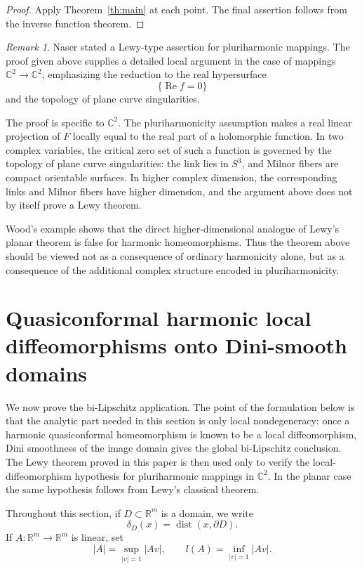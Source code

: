 \documentclass[11pt]{amsart}
\theoremstyle{definition}
\theoremstyle{remark}
\newtheorem{remark}[theorem]{Remark}
\newcommand{\C}{\mathbb C}
\newcommand{\R}{\mathbb R}
\newcommand{\re}{\operatorname{Re}}
\begin{document}
\begin{proof}
Apply Theorem~\ref{th:main} at each point. The final assertion follows
from the inverse function theorem.
\end{proof}
\begin{remark}\label{rem:scope-and-context}
Naser \cite{Naser1973} stated a Lewy-type assertion for pluriharmonic
mappings. The proof given above supplies a detailed local argument in
the case of mappings \(\C^2\to\C^2\), emphasizing the reduction to the
real hypersurface
\[
        \{\re f=0\}
\]
and the topology of plane curve singularities.

The proof is specific to \(\C^2\). The pluriharmonicity assumption makes
a real linear projection of \(F\) locally equal to the real part of a
holomorphic function. In two complex variables, the critical zero set of
such a function is governed by the topology of plane curve singularities:
the link lies in \(S^3\), and Milnor fibers are compact orientable
surfaces. In higher complex dimension, the corresponding links and
Milnor fibers have higher dimension, and the argument above does not by
itself prove a Lewy theorem.

Wood's example \cite{Wood1991} shows that the direct higher-dimensional
analogue of Lewy's planar theorem is false for harmonic homeomorphisms.
Thus the theorem above should be viewed not as a consequence of ordinary
harmonicity alone, but as a consequence of the additional complex
structure encoded in pluriharmonicity.
\end{remark}

\section{Quasiconformal harmonic local diffeomorphisms onto Dini-smooth domains}

We now prove the bi-Lipschitz application.  The point of the formulation
below is that the analytic part needed in this section is only local
nondegeneracy: once a harmonic quasiconformal homeomorphism is known to be a
local diffeomorphism, Dini smoothness of the image domain gives the global
bi-Lipschitz conclusion.  The Lewy theorem proved in this paper is then used
only to verify the local-diffeomorphism hypothesis for pluriharmonic mappings
in \(\C^2\).  In the planar case the same hypothesis follows from Lewy's
classical theorem.

Throughout this section, if \(D\subset\R^m\) is a domain, we write
\[
        \delta_D(x)=\operatorname{dist}(x,\partial D).
\]
If \(A:\R^m\to\R^m\) is linear, set
\[
        |A|=\sup_{|v|=1}|Av|,
        \qquad
        l(A)=\inf_{|v|=1}|Av|.
\]
\end{document}
